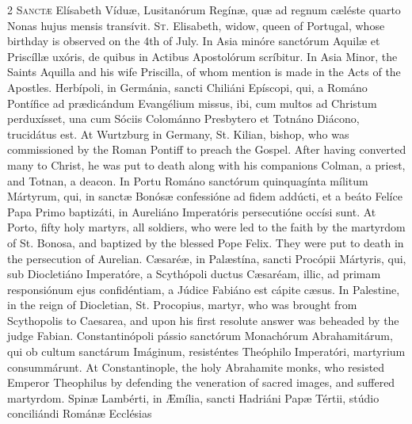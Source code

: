 \begin{paracol}{2}
\lettrine[lines=2]{S}{anctæ} Elísabeth Víduæ, 
 Lusitanórum Regínæ, quæ ad regnum cæléste quarto Nonas hujus mensis 
 transívit.
\switchcolumn
{}
\lettrine[lines=2]{S}{t.} Elisabeth, widow, queen of 
 Portugal, whose birthday is observed on the 4th of July.
\switchcolumn*
{}
In Asia minóre 
 sanctórum Aquilæ et Priscíllæ uxóris, de quibus in Actibus Apostolórum 
 scríbitur.
\switchcolumn
{}
In Asia Minor, the Saints Aquilla 
 and his wife Priscilla, of whom mention is made in the Acts of the Apostles.
\switchcolumn*
{}
Herbípoli, in Germánia, 
 sancti Chiliáni Epíscopi, qui, a Románo Pontífice ad prædicándum Evangélium 
 missus, ibi, cum multos ad Christum perduxísset, una cum Sóciis Colománno 
 Presbytero et Totnáno Diácono, trucidátus est.
\switchcolumn
{}
At Wurtzburg in Germany, St. Kilian, 
 bishop, who was commissioned by the Roman Pontiff to preach the Gospel. 
 After having converted many to Christ, he was put to death along with his 
 companions Colman, a priest, and Totnan, a deacon.
\switchcolumn*
{}
In Portu Románo 
 sanctórum quinquagínta mílitum Mártyrum, qui, in sanctæ Bonósæ confessióne 
 ad fidem addúcti, et a beáto Felíce Papa Primo baptizáti, in Aureliáno 
 Imperatóris persecutióne occísi sunt.
\switchcolumn
{}
At Porto, fifty holy martyrs, all 
 soldiers, who were led to the faith by the martyrdom of St. Bonosa, and 
 baptized by the blessed Pope Felix. They were put to death in the 
 persecution of Aurelian.
\switchcolumn*
{}
Cæsaréæ, in Palæstína, 
 sancti Procópii Mártyris, qui, sub Diocletiáno Imperatóre, a Scythópoli 
 ductus Cæsaréam, illic, ad primam responsiónum ejus confidéntiam, a Júdice 
 Fabiáno est cápite cæsus.
\switchcolumn
{}
In Palestine, in the reign of 
 Diocletian, St. Procopius, martyr, who was brought from Scythopolis to 
 Caesarea, and upon his first resolute answer was beheaded by the judge 
 Fabian.
\switchcolumn*
{}
Constantinópoli pássio 
 sanctórum Monachórum Abrahamitárum, qui ob cultum sanctárum Imáginum, 
 resisténtes Theóphilo Imperatóri, martyrium consummárunt.
\switchcolumn
{}
At Constantinople, the holy 
 Abrahamite monks, who resisted Emperor Theophilus by defending the 
 veneration of sacred images, and suffered martyrdom.
\switchcolumn*
{}
Spinæ Lambérti, in 
 Æmília, sancti Hadriáni Papæ Tértii, stúdio conciliándi Románæ Ecclésias 

\end{paracol}
